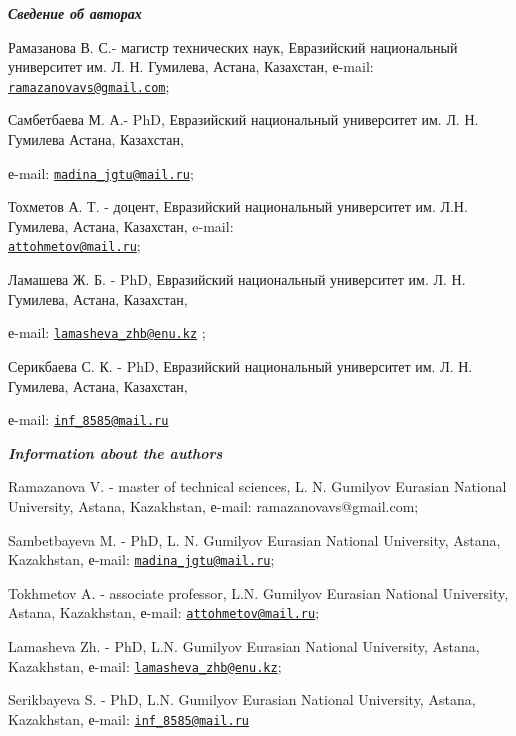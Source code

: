 \begin{authorinfo}
\hspace{1em}\emph{{\bfseries Сведение об авторах}}

Рамазанова В. С.- магистр технических наук, Евразийский национальный
университет им. Л. Н. Гумилева, Астана, Казахстан, е-mail:
\href{mailto:ramazanovavs@gmail.com}{\nolinkurl{ramazanovavs@gmail.com}};

Самбетбаева М. А.- PhD, Евразийский национальный университет им. Л. Н.
Гумилева Астана, Казахстан,

е-mail:
\href{mailto:madina_jgtu@mail.ru}{\nolinkurl{madina\_jgtu@mail.ru}};

Тохметов А. Т. - доцент, Евразийский национальный университет им. Л.Н.
Гумилева, Астана, Казахстан, e-mail:\\
\href{mailto:attohmetov@mail.ru}{\nolinkurl{attohmetov@mail.ru}};

Ламашева Ж. Б. - PhD, Евразийский национальный университет им. Л. Н.
Гумилева, Астана, Казахстан,

е-mail:
\href{mailto:lamasheva_zhb@enu.kz}{\nolinkurl{lamasheva\_zhb@enu.kz}} ;

Серикбаева С. К. - PhD, Евразийский национальный университет им. Л. Н.
Гумилева, Астана, Казахстан,

е-mail: \href{mailto:inf_8585@mail.ru}{\nolinkurl{inf\_8585@mail.ru}}

\hspace{1em}\emph{{\bfseries Information about the authors}}

Ramazanova V. - master of technical sciences, L. N. Gumilyov Eurasian
National University, Astana, Kazakhstan, е-mail: ramazanovavs@gmail.com;

Sambetbayeva M. - PhD, L. N. Gumilyov Eurasian National University,
Astana, Kazakhstan, е-mail:
\href{mailto:madina_jgtu@mail.ru}{\nolinkurl{madina\_jgtu@mail.ru}};

Tokhmetov A. - associate professor, L.N. Gumilyov Eurasian National
University, Astana, Kazakhstan, е-mail:
\href{mailto:attohmetov@mail.ru}{\nolinkurl{attohmetov@mail.ru}};

Lamasheva Zh. - PhD, L.N. Gumilyov Eurasian National University, Astana,
Kazakhstan, е-mail:
\href{mailto:lamasheva_zhb@enu.kz}{\nolinkurl{lamasheva\_zhb@enu.kz}};

Serikbayeva S. - PhD, L.N. Gumilyov Eurasian National University,
Astana, Kazakhstan, е-mail:
\href{mailto:inf_8585@mail.ru}{\nolinkurl{inf\_8585@mail.ru}}
\end{authorinfo}
